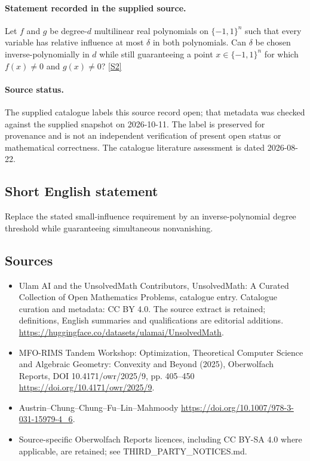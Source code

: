 \documentclass[11pt]{article}
\begin{document}
\paragraph{Statement recorded in the supplied source.}
Let $f$ and $g$ be degree-$d$ multilinear real polynomials on $\{-1,1\}^n$ such that every variable has relative influence at most $\delta$ in both polynomials. Can $\delta$ be chosen inverse-polynomially in $d$ while still guaranteeing a point $x\in\{-1,1\}^n$ for which $f(x)\neq0$ and $g(x)\neq0$? \href{https://doi.org/10.4171/owr/2025/9}{[S2]}
\paragraph{Source status.}
The supplied catalogue labels this source record open; that metadata was checked against the supplied snapshot on 2026-10-11. The label is preserved for provenance and is not an independent verification of present open status or mathematical correctness. The catalogue literature assessment is dated 2026-08-22.
\subsection{Short English statement}
Replace the stated small-influence requirement by an inverse-polynomial degree threshold while guaranteeing simultaneous nonvanishing.
\subsection{Sources}
\begin{itemize}
\item[S1] Ulam AI and the UnsolvedMath Contributors, UnsolvedMath: A Curated Collection of Open Mathematics Problems, catalogue entry. Catalogue curation and metadata: CC BY 4.0. The source extract is retained; definitions, English summaries and qualifications are editorial additions.
\url{https://huggingface.co/datasets/ulamai/UnsolvedMath}.
\item[S2] MFO-RIMS Tandem Workshop: Optimization, Theoretical Computer Science and Algebraic Geometry: Convexity and Beyond (2025), Oberwolfach Reports, DOI 10.4171/owr/2025/9, pp. 405--450
\url{https://doi.org/10.4171/owr/2025/9}.
\item[S3] Austrin--Chung--Chung--Fu--Lin--Mahmoody
\url{https://doi.org/10.1007/978-3-031-15979-4_6}.
\item Source-specific Oberwolfach Reports licences, including CC BY-SA 4.0 where applicable, are retained; see THIRD\_PARTY\_NOTICES.md.
\end{itemize}
\end{document}
